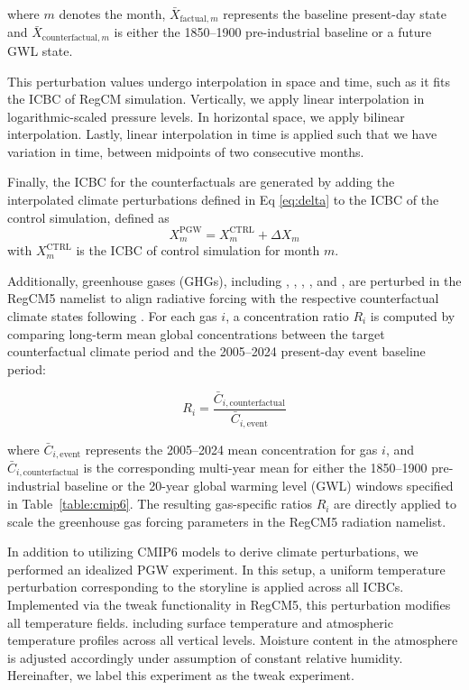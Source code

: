 \documentclass[journal abbreviation, manuscript]{copernicus}
\begin{document}
where $m$ denotes the month, $\bar{X}_{\text{factual}, m}$ represents the baseline present-day state and $\bar{X}_{\text{counterfactual}, m}$ is either the 1850--1900 pre-industrial baseline or a future GWL state.

This perturbation values undergo interpolation in space and time, such as it fits the ICBC of RegCM simulation. Vertically, we apply linear interpolation in logarithmic-scaled pressure levels. In horizontal space, we apply bilinear interpolation. Lastly, linear interpolation in time is applied such that we have variation in time, between midpoints of two consecutive months.

Finally, the ICBC for the counterfactuals are generated by adding the interpolated climate perturbations defined in Eq \eqref{eq:delta} to the ICBC of the control simulation, defined as
\begin{equation}
    X^{\text{PGW}}_m = X^{\text{CTRL}}_m + \Delta X_m
\end{equation}
with $X^{\text{CTRL}}_m$ is the ICBC of control simulation for month $m$.

Additionally, greenhouse gases (GHGs), including , , , , and , are perturbed in the RegCM5 namelist to align radiative forcing with the respective counterfactual climate states following \citet{meinshausen2017historical, meinshausen2020ssp}. For each gas $i$, a concentration ratio $R_i$ is computed by comparing long-term mean global concentrations between the target counterfactual climate period and the 2005--2024 present-day event baseline period:

\begin{equation}
R_i = \frac{\bar{C}_{i, \text{counterfactual}}}{\bar{C}_{i, \text{event}}}
\label{eq:ghg_ratio}
\end{equation}

where $\bar{C}_{i, \text{event}}$ represents the 2005--2024 mean concentration for gas $i$, and $\bar{C}_{i, \text{counterfactual}}$ is the corresponding multi-year mean for either the 1850--1900 pre-industrial baseline or the 20-year global warming level (GWL) windows specified in Table~\ref{table:cmip6}. The resulting gas-specific ratios $R_i$ are directly applied to scale the greenhouse gas forcing parameters in the RegCM5 radiation namelist.

In addition to utilizing CMIP6 models to derive climate perturbations, we performed an idealized PGW experiment. In this setup, a uniform temperature perturbation corresponding to the storyline is applied across all ICBCs. Implemented via the tweak functionality in RegCM5, this perturbation modifies all temperature fields. including surface temperature and atmospheric temperature profiles across all vertical levels. Moisture content in the atmosphere is adjusted accordingly under assumption of constant relative humidity. Hereinafter, we label this experiment as the tweak experiment.
\end{document}
